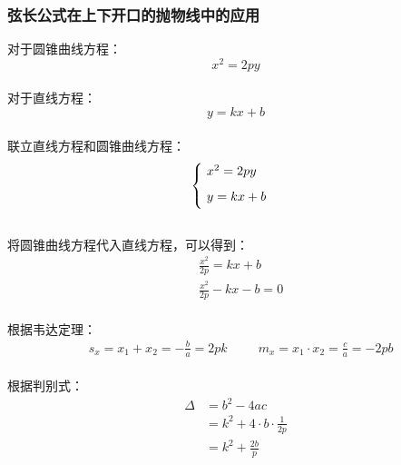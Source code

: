 \documentclass[UTF8]{ctexart}
\begin{document}
\newpage

\subsubsection{弦长公式在上下开口的抛物线中的应用}
    对于圆锥曲线方程：
    \setcounter{equation}{0}
    \begin{equation}
        x^2=2py
    \end{equation}\\
    对于直线方程：
    \begin{equation}
        y=kx+b
    \end{equation}\\
    联立直线方程和圆锥曲线方程：
    \begin{equation}
        \begin{cases}
            \ x^2=2py\\[2mm]
            \ y=kx+b\vspace{3pt}
        \end{cases}
    \end{equation}\\[3mm]
    将圆锥曲线方程代入直线方程，可以得到：\vspace{5pt}
    \begin{align}
        &\frac{x^2}{2p}=kx+b\\[3mm]
        &\frac{x^2}{2p}-kx-b=0
    \end{align}\\[1mm]
    根据韦达定理：
    \begin{align}
        &s_x=x_1+x_2=-\frac{b}{a}=2pk\qquad~~
        m_x=x_1\cdot x_2=\frac{c}{a}=-2pb
    \end{align}\\[1mm]
    根据判别式：
    \begin{align}
        \Delta&=b^2-4ac\\[4mm]
        &=k^2+4\cdot b\cdot\frac{1}{2p}\\[4mm]
        &=k^2+\frac{2b}{p}
    \end{align}

\newpage
\end{document}
